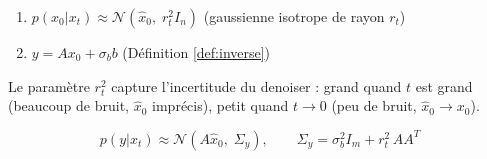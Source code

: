\documentclass[12pt]{article}
\begin{document}
\begin{hypothesebox}
\label{hyp:pigdm}
\begin{enumerate}[label=(H\arabic*)]
    \item $p(x_0 | x_t) \approx \mathcal{N}(\hat{x}_0,\; r_t^2 I_n)$ \quad (gaussienne isotrope de rayon $r_t$)
    \item $y = Ax_0 + \sigma_b b$ \quad (Définition \ref{def:inverse})
\end{enumerate}
\end{hypothesebox}

Le paramètre $r_t^2$ capture l'incertitude du denoiser : grand quand $t$ est grand (beaucoup de bruit, $\hat{x}_0$ imprécis), petit quand $t \to 0$ (peu de bruit, $\hat{x}_0 \to x_0$).

\begin{resultbox}
\label{res:pigdm}
\begin{equation}
    p(y | x_t) \approx \mathcal{N}\!\left(A\hat{x}_0,\; \Sigma_y\right), \qquad \Sigma_y = \sigma_b^2 I_m + r_t^2\, AA^T
\end{equation}
\end{resultbox}
\end{document}
